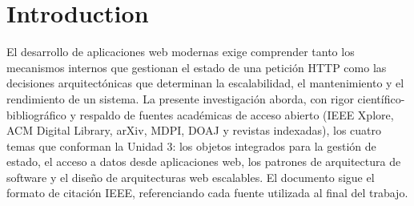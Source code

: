 \section{Introduction}

El desarrollo de aplicaciones web modernas exige comprender tanto los mecanismos internos que gestionan el estado de una petición HTTP como las decisiones arquitectónicas que determinan la escalabilidad, el mantenimiento y el rendimiento de un sistema. La presente investigación aborda, con rigor científico-bibliográfico y respaldo de fuentes académicas de acceso abierto (IEEE Xplore, ACM Digital Library, arXiv, MDPI, DOAJ y revistas indexadas), los cuatro temas que conforman la Unidad 3: los objetos integrados para la gestión de estado, el acceso a datos desde aplicaciones web, los patrones de arquitectura de software y el diseño de arquitecturas web escalables. El documento sigue el formato de citación IEEE, referenciando cada fuente utilizada al final del trabajo.
